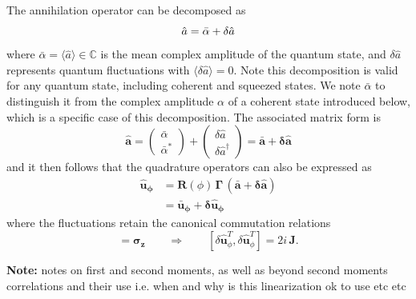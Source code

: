 The annihilation operator can be decomposed as
\begin{equation}
    \hat{a}  = \bar{\alpha} + \delta\hat{a} \\
\label{II.8}
\end{equation}
where \( \bar{\alpha} = \langle \hat{a} \rangle \in \mathbb{C}\) is the mean complex amplitude of the quantum state, and \(\delta\hat{a}\) represents quantum fluctuations with \(\langle \delta\hat{a}\rangle = 0\). Note this decomposition is valid for any quantum state, including coherent and squeezed states. We note $\bar{\alpha}$ to distinguish it from the complex amplitude $\alpha$ of a coherent state introduced below, which is a specific case of this decomposition. The associated matrix form is 
\begin{equation}
\mathbf{\hat{a}} =  \begin{pmatrix} \bar{\alpha}  \\ \bar{\alpha}^*  \end{pmatrix} + \begin{pmatrix} \delta\hat{a} \\ \delta\hat{a}^\dagger \end{pmatrix} =  \mathbf{\bar{a}} + \mathbf{\delta \hat{a}}
\end{equation}
and it then follows that the quadrature operators can also be expressed as
\begin{equation}
  \begin{split}
    \mathbf{\hat{u}_\phi} & = \mathbf{R}(\phi) \, \mathbf\Gamma  \,(\mathbf{\bar{a}} + \mathbf{\delta \hat{a}}) \\
    & = \mathbf{\bar{u}_\phi}  + \mathbf{\delta \hat{u}_\phi} 
  \end{split}
\end{equation}
where the fluctuations retain the canonical commutation relations
\begin{equation}
[\delta \mathbf{\hat{a}}, \delta \mathbf{\hat{a}}^{\dagger}] = \mathbf{\sigma_z} \qquad \Rightarrow \qquad
[\delta \mathbf{\hat{u}}_\phi^T, \delta \mathbf{\hat{u}}_\phi^T] = 2i\,\mathbf{J}.
\label{II.11}
\end{equation}

\noindent \textbf{Note:} \color{red} notes on first and second moments, as well as beyond second moments correlations and their use i.e. when and why is this linearization ok to use etc etc \color{black}

